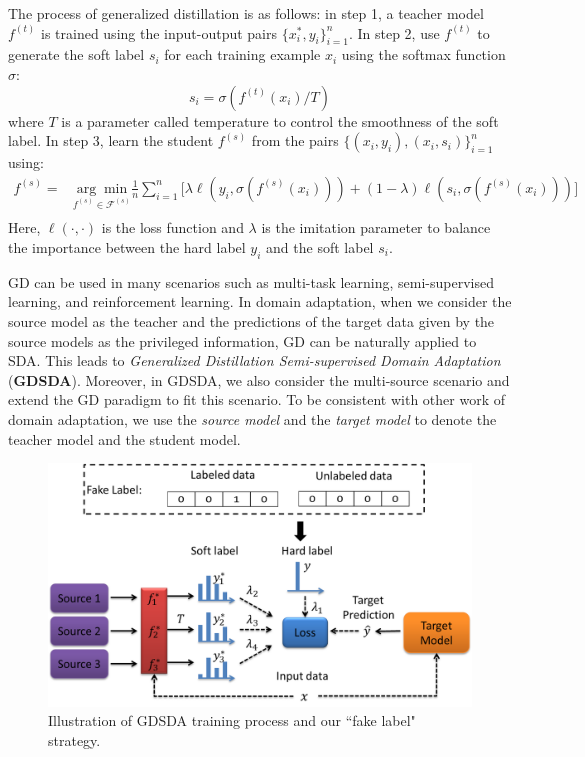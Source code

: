 The process of generalized distillation is as follows: in step 1, a teacher model ${f}^{(t)}$ is trained using the input-output pairs $\{x^*_i,y_i\}_{i=1}^n$. In step 2, use ${f}^{(t)}$ to generate the soft label $s_i$ for each training example $x_i$ using the softmax function $\sigma$:
\begin{equation}\label{eq:softmax_T}
s_i=\sigma(f^{(t)}(x_i)/T)
\end{equation}
where $T$ is a parameter called temperature to control the smoothness of the soft label. In step 3, learn the student ${f}^{(s)}$ from the pairs $\{\left(x_i,y_i\right),\left(x_i,s_i\right)\}_{i=1}^n$ using:
\begin{equation}\label{eq:distill}
\begin{aligned}
f^{(s)}=&\underset{f^{(s)} \in \mathcal{F}^{(s)}}{\arg \min}\frac{1}{n}\sum_{i=1}^{n}\bigg[\lambda\ell\left(y_i,\sigma(f^{(s)}(x_i))\right)
+(1-\lambda)\ell\left(s_i,\sigma(f^{(s)}(x_i))\right)\bigg]\\
\end{aligned}
\end{equation}
Here, $\ell(\cdot,\cdot)$ is the loss function and $\lambda$ is the imitation parameter to balance the importance between the hard label $y_i$ and the soft label $s_i$.

GD can be used in many scenarios such as multi-task learning, semi-supervised learning, and reinforcement learning. In domain adaptation, when we consider the source model as the teacher and the predictions of the target data given by the source models as the privileged information,
GD can be naturally applied to SDA. This leads to \textit{Generalized Distillation Semi-supervised Domain Adaptation} (\textbf{GDSDA}). Moreover, in GDSDA, we also consider the multi-source scenario and extend the GD paradigm to fit this scenario. To be consistent with other work of domain adaptation, we use the \textit{source model} and the \textit{target model} to denote the teacher model and the student model.
\begin{figure}
	\centering
	\includegraphics[scale=.5]{aaai/figure/multi-GDDA.png}
	\caption{Illustration of GDSDA training process and our ``fake label" strategy.}\label{fig:GDSDA}
\end{figure}

